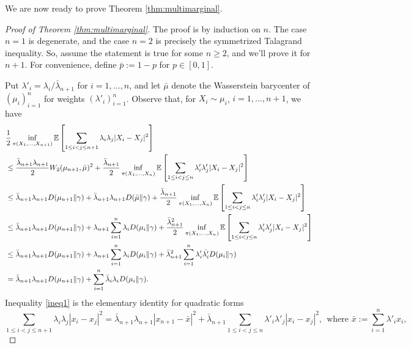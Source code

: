 \documentclass[10pt]{article}
\newcommand{\EE}{\mathbb{E}}
\begin{document}
\noindent We are now ready to prove Theorem \ref{thm:multimarginal}.
\begin{proof}[Proof of Theorem \ref{thm:multimarginal}]
The proof is by induction on $n$.  The case $n=1$ is degenerate, and the case $n=2$ is precisely the symmetrized Talagrand inequality.  So, assume the statement is true for some $n\geq 2$, and we'll prove it for $n+1$.  For convenience, define $\bar{p} := 1-p$ for $p\in [0,1]$.

Put $\lambda'_i = \lambda_i / \bar{\lambda}_{n+1}$ for $i=1,\dots,n$,  and let $\bar{\mu}$ denote the Wasserstein barycenter of $(\mu_i)_{i=1}^n$ for weights $(\lambda'_i)_{i=1}^n$.  Observe that, for $X_i \sim \mu_i$, $i=1,\dots, n+1$, we have 
\begin{align}
&\frac{1}{2} \inf_{\pi(X_1, \dots, X_{n+1})} \EE\left[  \sum_{1 \leq i < j \leq n+1} \lambda_i \lambda_j  |X_i - X_j|^2  \right] \notag\\
&\leq  \frac{\bar{\lambda}_{n+1} \lambda_{n+1} }{2}W_2(\mu_{n+1},\bar{\mu})^2 + \frac{\bar{\lambda}_{n+1}}{2} \inf_{\pi(X_1, \dots, X_{n})} \EE\left[  \sum_{1 \leq i < j \leq n}  \lambda'_i \lambda'_j |X_i - X_j|^2  \right]  \label{ineq1} \\
&\leq \bar{\lambda}_{n+1} \lambda_{n+1}  D(\mu_{n+1} \| \gamma) + \bar{\lambda}_{n+1} \lambda_{n+1}  D(\bar{\mu}  \| \gamma) +  \frac{\bar{\lambda}_{n+1}}{2} \inf_{\pi(X_1, \dots, X_{n})} \EE\left[  \sum_{1 \leq i < j \leq n} \lambda'_i \lambda_j '|X_i - X_j|^2  \right]  \label{ineq2} \\
&\leq \bar{\lambda}_{n+1} \lambda_{n+1}   D(\mu_{n+1} \| \gamma)  +  \lambda_{n+1}   \sum_{i=1}^n \lambda_i D (\mu_i \|\gamma)  +  \frac{\bar{\lambda}_{n+1}^2  }{2} \inf_{\pi(X_1, \dots, X_{n})} \EE\left[  \sum_{1 \leq i < j \leq n} \lambda'_i \lambda_j '  |X_i - X_j|^2  \right]  \label{ineq3}\\
&\leq \bar{\lambda}_{n+1} \lambda_{n+1}   D(\mu_{n+1} \| \gamma)  +  \lambda_{n+1}   \sum_{i=1}^n \lambda_i D(\mu_i \|\gamma)  +   \bar{\lambda}_{n+1}^2   \sum_{i=1}^n \lambda'_i \bar{\lambda'_i}D(\mu_i\|\gamma)  \label{ineq4}\\
&= \bar{\lambda}_{n+1} \lambda_{n+1}   D(\mu_{n+1} \| \gamma) +    \sum_{i=1}^n \bar{\lambda}_i \lambda_i D (\mu_i \|\gamma)  .  \notag
\end{align}
Inequality \eqref{ineq1} is the elementary identity for quadratic forms
$$
  \sum_{1 \leq i < j \leq n+1}  \lambda_i \lambda_j |x_i - x_j|^2  = 
\bar{\lambda}_{n+1} \lambda_{n+1}  |x_{n+1} - \bar{x}|^2 + \bar{\lambda}_{n+1}  \sum_{1 \leq i < j \leq n}  \lambda'_i \lambda'_j  |x_i - x_j|^2, ~~\mbox{where $\bar{x} := \sum_{i=1}^n \lambda'_i x_i$},
$$
\end{proof}
\end{document}
